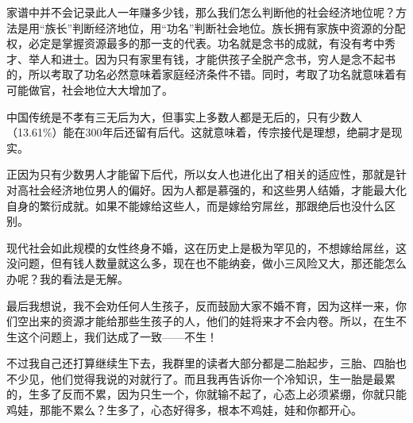 \documentclass[UTF8, 11pt, oneside]{ctexart}
\begin{document}
家谱中并不会记录此人一年赚多少钱，那么我们怎么判断他的社会经济地位呢？方法是用“族长”判断经济地位，用“功名”判断社会地位。族长拥有家族中资源的分配权，必定是掌握资源最多的那一支的代表。功名就是念书的成就，有没有考中秀才、举人和进士。因为只有家里有钱，才能供孩子全脱产念书，穷人是念不起书的，所以考取了功名必然意味着家庭经济条件不错。同时，考取了功名就意味着有可能做官，社会地位大大增加了。

中国传统是不孝有三无后为大，但事实上多数人都是无后的，只有少数人（13.61\%）能在300年后还留有后代。这就意味着，传宗接代是理想，绝嗣才是现实。

正因为只有少数男人才能留下后代，所以女人也进化出了相关的适应性，那就是针对高社会经济地位男人的偏好。因为人都是慕强的，和这些男人结婚，才能最大化自身的繁衍成就。如果不能嫁给这些人，而是嫁给穷屌丝，那跟绝后也没什么区别。

现代社会如此规模的女性终身不婚，这在历史上是极为罕见的，不想嫁给屌丝，这没问题，但有钱人数量就这么多，现在也不能纳妾，做小三风险又大，那还能怎么办呢？我的看法是无解。

最后我想说，我不会劝任何人生孩子，反而鼓励大家不婚不育，因为这样一来，你们空出来的资源才能给那些生孩子的人，他们的娃将来才不会内卷。所以，在生不生这个问题上，我们达成了一致——不生！

不过我自己还打算继续生下去，我群里的读者大部分都是二胎起步，三胎、四胎也不少见，他们觉得我说的对就行了。而且我再告诉你一个冷知识，生一胎是最累的，生多了反而不累，因为只生一个，你就输不起了，心态上必须紧绷，你就只能鸡娃，那能不累么？生多了，心态好得多，根本不鸡娃，娃和你都开心。
\end{document}
